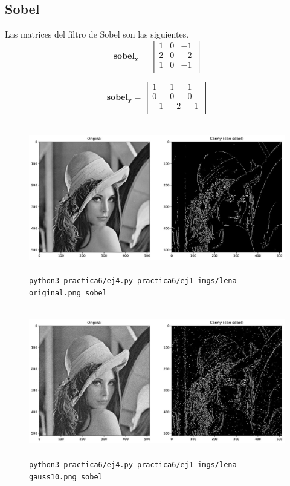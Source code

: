 \documentclass[11pt, spanish]{article}
\begin{document}
\newpage
\subsection{Sobel}
Las matrices del filtro de Sobel son las siguientes.
\[
\mathbf{sobel_x} = \begin{bmatrix} 
1 & 0 & -1 \\
2 & 0 & -2 \\
1 & 0 & -1 \\
\end{bmatrix}
\]

\[
\mathbf{sobel_y} = \begin{bmatrix} 
1 & 1 & 1 \\
0 & 0 & 0 \\
-1 & -2 & -1 \\
\end{bmatrix}
\]

\begin{figure}[H]
\centering
    \includegraphics[height=6.5cm]{informe-imgs/ej4-sobel-lena-original.jpg}
    \caption{\texttt{python3 practica6/ej4.py practica6/ej1-imgs/lena-original.png sobel}}
\end{figure}

\begin{figure}[H]
\centering
    \includegraphics[height=6.5cm]{informe-imgs/ej4-sobel-lena-gauss10.jpg}
    \caption{\texttt{python3 practica6/ej4.py practica6/ej1-imgs/lena-gauss10.png sobel}}
\end{figure}
\end{document}
